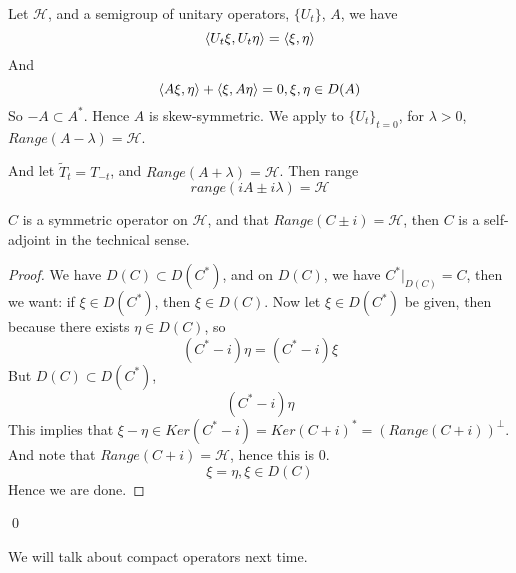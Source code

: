 Let $\mathcal{H}$, and a semigroup of unitary operators, $\{U_t\}$, $A$, we have 
\begin{equation*}
    \langle U_t\xi, U_t\eta\rangle=\langle \xi, \eta\rangle
\end{equation*}
And 
\begin{equation*}
    \langle A\xi, \eta\rangle+\langle \xi, A\eta\rangle=0, \xi, \eta\in D(A)
\end{equation*}
So $-A\subset A^*$. Hence $A$ is skew-symmetric. We apply to $\{U_t\}_{t=0}$, for $\lambda>0$, $Range(A-\lambda)=\mathcal{H}$.

And let $\tilde{T}_t=T_{-t}$, and $Range(A+\lambda)=\mathcal{H}$. Then range 
\begin{equation*}
    range(iA\pm i\lambda)=\mathcal{H}
\end{equation*}

\begin{proposition}
    $C$ is a symmetric operator on $\mathcal{H}$, and that $Range(C\pm i)=\mathcal{H}$, then $C$ is a self-adjoint in the technical sense.
\end{proposition}
\begin{proof}
    We have $D(C)\subset D(C^*)$, and on $D(C)$, we have $C^*\vert_{D(C)}=C$, then we want: if $\xi\in D(C^*)$, then $\xi\in D(C)$. Now let $\xi\in D(C^*)$ be given, then because there exists $\eta\in D(C)$, so 
    \begin{equation*}
        (C^*-i)\eta=(C^*-i)\xi
    \end{equation*}
    But $D(C)\subset D(C^*)$, 
    \begin{equation*}
        (C^*-i)\eta
    \end{equation*}
    This implies that $\xi-\eta\in Ker(C^*-i)=Ker(C+i)^*=(Range (C+i))^\perp$. And note that $Range(C+i)=\mathcal{H}$, hence this is 0.
    \begin{equation*}
        \xi=\eta, \xi\in D(C)
    \end{equation*}
    Hence we are done.
\end{proof}
\qed

We will talk about compact operators next time. 

